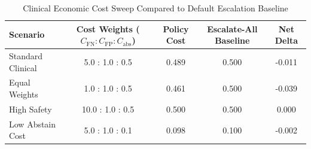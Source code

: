 \begin{table}[t]
\centering
\small
\caption{Clinical Economic Cost Sweep Compared to Default Escalation Baseline}
\label{tab:cost_sweep}
\begin{tabular}{lcccc}
\toprule
\textbf{Scenario} & \textbf{Cost Weights ($C_{\text{FN}} : C_{\text{FP}} : C_{\text{abs}}$)} & \textbf{Policy Cost} & \textbf{Escalate-All Baseline} & \textbf{Net Delta} \\
\midrule
Standard Clinical & 5.0 : 1.0 : 0.5 & 0.489 & 0.500 & -0.011 \\
Equal Weights & 1.0 : 1.0 : 0.5 & 0.461 & 0.500 & -0.039 \\
High Safety & 10.0 : 1.0 : 0.5 & 0.500 & 0.500 & 0.000 \\
Low Abstain Cost & 5.0 : 1.0 : 0.1 & 0.098 & 0.100 & -0.002 \\
\bottomrule
\end{tabular}
\end{table}
